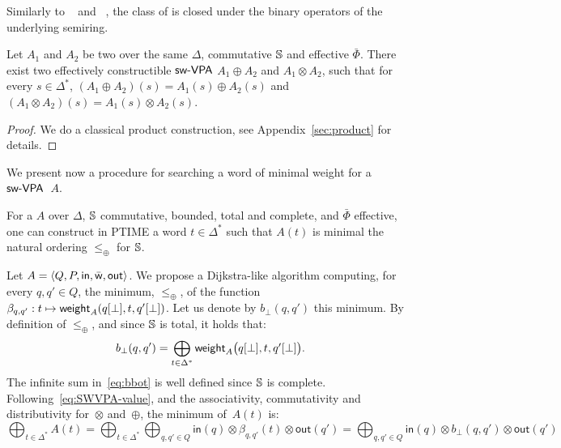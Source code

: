\medskip\noindent
Similarly to \VPA~\cite{AlurMadhusudan09nested}
and \SVPA~\cite{dAntonyAlur14SVPDA},
the class of \SWVPA is closed under the binary operators of the underlying semiring.
%
\begin{proposition}\label{prop:SWVPA-product}
Let $A_1$ and $A_2$ be two \SWVPA
over the same $\Delta$, commutative $\mathbb{S}$ and effective $\bar\Phi$.
There exist two effectively constructible $\textsf{sw-VPA}$
$A_1 \oplus A_2$ and $A_1 \otimes A_2$,
such that for every $s \in \Delta^*$,
$(A_1 \oplus A_2)(s) = A_1(s) \oplus A_2(s)$ and
$(A_1 \otimes A_2)(s) = A_1(s) \otimes A_2(s)$.
\end{proposition}
%
\begin{proof}
We do a classical product construction, see Appendix~\ref{sec:product} for details.
\end{proof}
\noindent
We present now a procedure for searching a word of minimal weight for a~$\textsf{sw-VPA}$~$A$.
%
\begin{proposition}\label{th:best-search}
For a \SWVPA $A$
over $\Delta$,
$\mathbb{S}$ commutative, bounded, total and complete, %
and $\bar\Phi$ effective, %
one can construct in PTIME a word $t \in \Delta^*$
such that $A(t)$ is minimal \wrt the natural ordering $\leq_\oplus$ for $\mathbb{S}$.
\end{proposition}
%
Let $A = \< Q, P, \init, \bar\wei, \final >$.
%
We propose a Dijkstra-like algorithm computing,
for every $q, q' \in Q$,
the minimum, \wrt $\leq_\oplus$, of the function
$\beta_{q, q'} : t \mapsto \mathsf{weight}_A(q[{\bot}], t, q'[{\bot}])$.
Let us denote by $b_\bot(q, q')$ this minimum.
By definition of $\leq_\oplus$, and since $\mathbb{S}$ is total,
it holds that:
%
\begin{equation}\label{eq:bbot}
  b_\bot(q, q') = \bigoplus_{t\in \Delta^*}
  \textstyle
  \mathsf{weight}_A\bigl(q[{\bot}], t, q'[{\bot}]\bigr).
\end{equation}
The infinite sum in~\eqref{eq:bbot} is well defined since $\mathbb{S}$ is complete.
%
Following~\eqref{eq:SWVPA-value}, and the associativity, commutativity
and distributivity for~$\otimes$ and~$\oplus$, the minimum of~$A(t)$ is:
\begin{equation}\label{eq:min}
{\displaystyle\bigoplus_{t\in \Delta^*}} A(t)
=
{\displaystyle\bigoplus_{t\in \Delta^*}}
{\displaystyle\bigoplus_{q, q' \in Q}} \textstyle
\mathsf{in}(q) \mathop{\otimes}
\beta_{q, q'}(t)
\mathop{\otimes} \mathsf{out}(q')
=
{\displaystyle\bigoplus_{q, q' \in Q}} \textstyle
\mathsf{in}(q) \mathop{\otimes}
b_\bot(q, q')
\mathop{\otimes} \mathsf{out}(q')
\end{equation}

